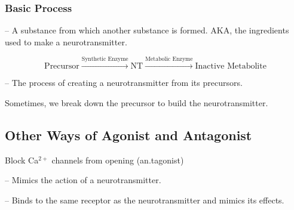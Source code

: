 \subsubsection{Basic Process}

\begin{coloredlist}
    \item {} -- A substance from which another substance is formed. AKA, the ingredients used to make a neurotransmitter.
    \item \[
        \text{Precursor} \xrightarrow{\text{Synthetic Enzyme}} \text{NT} \xrightarrow{\text{Metabolic Enzyme}} \text{Inactive Metabolite}
    \]
    \begin{coloredlist}
        \item {} -- The process of creating a neurotransmitter from its precursors.
        \item Sometimes, we break down the precursor to build the neurotransmitter.
    \end{coloredlist}
\end{coloredlist}

\subsection{Other Ways of Agonist and Antagonist}

\begin{coloredlist}
    \item Block Ca\(^{2+}\) channels from opening (an.tagonist)
    \item {} -- Mimics the action of a neurotransmitter.
    \begin{coloredlist}
        \item {} -- Binds to the same receptor as the neurotransmitter and mimics its effects.
    \end{coloredlist}
\end{coloredlist}
